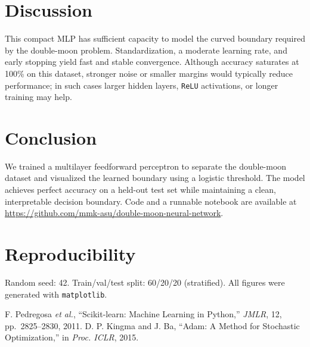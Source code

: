 \documentclass[journal]{IEEEtran}
\begin{document}
\section{Discussion}
This compact MLP has sufficient capacity to model the curved boundary required by the double-moon problem. Standardization, a moderate learning rate, and early stopping yield fast and stable convergence. Although accuracy saturates at 100\% on this dataset, stronger noise or smaller margins would typically reduce performance; in such cases larger hidden layers, \texttt{ReLU} activations, or longer training may help.

\section{Conclusion}
We trained a multilayer feedforward perceptron to separate the double-moon dataset and visualized the learned boundary using a logistic threshold. The model achieves perfect accuracy on a held-out test set while maintaining a clean, interpretable decision boundary. Code and a runnable notebook are available at \url{https://github.com/mmk-asu/double-moon-neural-network}.

\section*{Reproducibility}
Random seed: 42. Train/val/test split: 60/20/20 (stratified). All figures were generated with \texttt{matplotlib}.

\begin{thebibliography}{00}
F. Pedregosa \emph{et al.}, ``Scikit-learn: Machine Learning in Python,'' \emph{JMLR}, 12, pp.~2825--2830, 2011.
D. P. Kingma and J. Ba, ``Adam: A Method for Stochastic Optimization,'' in \emph{Proc. ICLR}, 2015.
\end{thebibliography}
\end{document}
